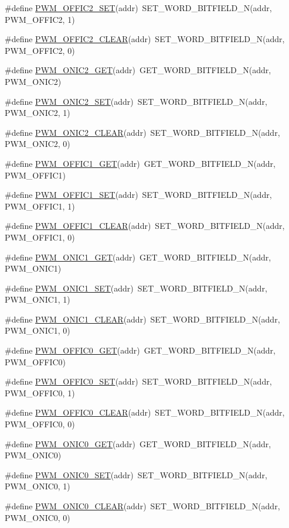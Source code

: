 \begin{DoxyCompactItemize}
\item 
\#define \hyperlink{a00564_af5564be3bf443234350c2b80211b1567}{PWM\_\-OFFIC2\_\-SET}(addr)~SET\_\-WORD\_\-BITFIELD\_\-N(addr, PWM\_\-OFFIC2, 1)
\item 
\#define \hyperlink{a00564_ae42a1fe5e4518bc0dfee492676b2c96c}{PWM\_\-OFFIC2\_\-CLEAR}(addr)~SET\_\-WORD\_\-BITFIELD\_\-N(addr, PWM\_\-OFFIC2, 0)
\item 
\#define \hyperlink{a00564_a060d2b37e47acd8e1de9245607a5c4d8}{PWM\_\-ONIC2\_\-GET}(addr)~GET\_\-WORD\_\-BITFIELD\_\-N(addr, PWM\_\-ONIC2)
\item 
\#define \hyperlink{a00564_af70b10ed5190f3b1a9613e31b97fb93b}{PWM\_\-ONIC2\_\-SET}(addr)~SET\_\-WORD\_\-BITFIELD\_\-N(addr, PWM\_\-ONIC2, 1)
\item 
\#define \hyperlink{a00564_a5f0912d18454d6050667c4e7d17c7a46}{PWM\_\-ONIC2\_\-CLEAR}(addr)~SET\_\-WORD\_\-BITFIELD\_\-N(addr, PWM\_\-ONIC2, 0)
\item 
\#define \hyperlink{a00564_a3550d9589a0cd7345b8e7019cf81fa03}{PWM\_\-OFFIC1\_\-GET}(addr)~GET\_\-WORD\_\-BITFIELD\_\-N(addr, PWM\_\-OFFIC1)
\item 
\#define \hyperlink{a00564_adcba3c74c2052236dbe0f3c96c5b400f}{PWM\_\-OFFIC1\_\-SET}(addr)~SET\_\-WORD\_\-BITFIELD\_\-N(addr, PWM\_\-OFFIC1, 1)
\item 
\#define \hyperlink{a00564_afb3d18e631b5e741ae8236585f451e3d}{PWM\_\-OFFIC1\_\-CLEAR}(addr)~SET\_\-WORD\_\-BITFIELD\_\-N(addr, PWM\_\-OFFIC1, 0)
\item 
\#define \hyperlink{a00564_a84e1d9087c566fdc4592ef904f8d40e4}{PWM\_\-ONIC1\_\-GET}(addr)~GET\_\-WORD\_\-BITFIELD\_\-N(addr, PWM\_\-ONIC1)
\item 
\#define \hyperlink{a00564_adc0cbd5f1ef7f2f7253df5f213283fa8}{PWM\_\-ONIC1\_\-SET}(addr)~SET\_\-WORD\_\-BITFIELD\_\-N(addr, PWM\_\-ONIC1, 1)
\item 
\#define \hyperlink{a00564_a504dffd7096900c3ed0d8b95180649b7}{PWM\_\-ONIC1\_\-CLEAR}(addr)~SET\_\-WORD\_\-BITFIELD\_\-N(addr, PWM\_\-ONIC1, 0)
\item 
\#define \hyperlink{a00564_aec3427bd9b2093025de0184955e43345}{PWM\_\-OFFIC0\_\-GET}(addr)~GET\_\-WORD\_\-BITFIELD\_\-N(addr, PWM\_\-OFFIC0)
\item 
\#define \hyperlink{a00564_a9379080a1862ff4ecc4d7589776f95cf}{PWM\_\-OFFIC0\_\-SET}(addr)~SET\_\-WORD\_\-BITFIELD\_\-N(addr, PWM\_\-OFFIC0, 1)
\item 
\#define \hyperlink{a00564_a3819a251e9df11cee8f45cabf5a6724f}{PWM\_\-OFFIC0\_\-CLEAR}(addr)~SET\_\-WORD\_\-BITFIELD\_\-N(addr, PWM\_\-OFFIC0, 0)
\item 
\#define \hyperlink{a00564_ac0d8ed268422f4e736e23d78a45a88ea}{PWM\_\-ONIC0\_\-GET}(addr)~GET\_\-WORD\_\-BITFIELD\_\-N(addr, PWM\_\-ONIC0)
\item 
\#define \hyperlink{a00564_a2e4beb18a25a212ad023649da445c40f}{PWM\_\-ONIC0\_\-SET}(addr)~SET\_\-WORD\_\-BITFIELD\_\-N(addr, PWM\_\-ONIC0, 1)
\item 
\#define \hyperlink{a00564_a8245441fae1de69895459bdd19e7aeea}{PWM\_\-ONIC0\_\-CLEAR}(addr)~SET\_\-WORD\_\-BITFIELD\_\-N(addr, PWM\_\-ONIC0, 0)
\end{DoxyCompactItemize}



